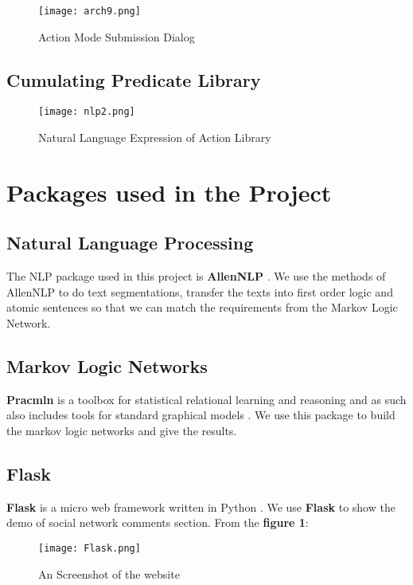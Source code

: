\documentclass[
12pt, %
a4paper, %
oneside, %
headinclude,footinclude, %
BCOR5mm, %
]{scrartcl}
\begin{document}
\begin{figure}[htb]
    \centering 
    \texttt{[image: arch9.png]} 
    \caption[Action Mode Submission Dialog]{Action Mode Submission Dialog} 
    \end{figure}

\subsection{Cumulating Predicate Library} 

\begin{figure}[htb]
    \centering 
    \texttt{[image: nlp2.png]} 
    \caption[Natural Language Expression of Action Library]{Natural Language Expression of Action Library} 
    \end{figure}

\section{Packages used in the Project}
\subsection{Natural Language Processing}
The NLP package used in this project is \textbf{AllenNLP} \cite{Gardner2017AllenNLP}. We use the methods of AllenNLP to do text segmentations, transfer the texts into first order logic and atomic sentences so that we can match the requirements from the Markov Logic Network.

\subsection{Markov Logic Networks}
\textbf{Pracmln} is a toolbox for statistical relational learning and reasoning and as such also includes tools for standard graphical models \cite{pracmln}. We use this package to build the markov logic networks and give the results.
\subsection{Flask}
\textbf{Flask} is a micro web framework written in Python 
\cite{grinberg2018flask}. We use \textbf{Flask} to show the demo of social network comments section. From the \textbf{figure 1}:
\begin{figure}[htb]
    \centering 
    \texttt{[image: Flask.png]} 
    \caption[An Screenshot of the website]{An Screenshot of the website} %
    \end{figure}
\end{document}
